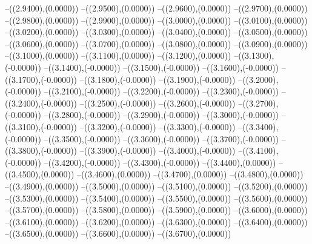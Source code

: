 {	--({\sx*(2.9400)},{\sy*(0.0000)})
	--({\sx*(2.9500)},{\sy*(0.0000)})
	--({\sx*(2.9600)},{\sy*(0.0000)})
	--({\sx*(2.9700)},{\sy*(0.0000)})
	--({\sx*(2.9800)},{\sy*(0.0000)})
	--({\sx*(2.9900)},{\sy*(0.0000)})
	--({\sx*(3.0000)},{\sy*(0.0000)})
	--({\sx*(3.0100)},{\sy*(0.0000)})
	--({\sx*(3.0200)},{\sy*(0.0000)})
	--({\sx*(3.0300)},{\sy*(0.0000)})
	--({\sx*(3.0400)},{\sy*(0.0000)})
	--({\sx*(3.0500)},{\sy*(0.0000)})
	--({\sx*(3.0600)},{\sy*(0.0000)})
	--({\sx*(3.0700)},{\sy*(0.0000)})
	--({\sx*(3.0800)},{\sy*(0.0000)})
	--({\sx*(3.0900)},{\sy*(0.0000)})
	--({\sx*(3.1000)},{\sy*(0.0000)})
	--({\sx*(3.1100)},{\sy*(0.0000)})
	--({\sx*(3.1200)},{\sy*(0.0000)})
	--({\sx*(3.1300)},{\sy*(-0.0000)})
	--({\sx*(3.1400)},{\sy*(-0.0000)})
	--({\sx*(3.1500)},{\sy*(-0.0000)})
	--({\sx*(3.1600)},{\sy*(-0.0000)})
	--({\sx*(3.1700)},{\sy*(-0.0000)})
	--({\sx*(3.1800)},{\sy*(-0.0000)})
	--({\sx*(3.1900)},{\sy*(-0.0000)})
	--({\sx*(3.2000)},{\sy*(-0.0000)})
	--({\sx*(3.2100)},{\sy*(-0.0000)})
	--({\sx*(3.2200)},{\sy*(-0.0000)})
	--({\sx*(3.2300)},{\sy*(-0.0000)})
	--({\sx*(3.2400)},{\sy*(-0.0000)})
	--({\sx*(3.2500)},{\sy*(-0.0000)})
	--({\sx*(3.2600)},{\sy*(-0.0000)})
	--({\sx*(3.2700)},{\sy*(-0.0000)})
	--({\sx*(3.2800)},{\sy*(-0.0000)})
	--({\sx*(3.2900)},{\sy*(-0.0000)})
	--({\sx*(3.3000)},{\sy*(-0.0000)})
	--({\sx*(3.3100)},{\sy*(-0.0000)})
	--({\sx*(3.3200)},{\sy*(-0.0000)})
	--({\sx*(3.3300)},{\sy*(-0.0000)})
	--({\sx*(3.3400)},{\sy*(-0.0000)})
	--({\sx*(3.3500)},{\sy*(-0.0000)})
	--({\sx*(3.3600)},{\sy*(-0.0000)})
	--({\sx*(3.3700)},{\sy*(-0.0000)})
	--({\sx*(3.3800)},{\sy*(-0.0000)})
	--({\sx*(3.3900)},{\sy*(-0.0000)})
	--({\sx*(3.4000)},{\sy*(-0.0000)})
	--({\sx*(3.4100)},{\sy*(-0.0000)})
	--({\sx*(3.4200)},{\sy*(-0.0000)})
	--({\sx*(3.4300)},{\sy*(-0.0000)})
	--({\sx*(3.4400)},{\sy*(0.0000)})
	--({\sx*(3.4500)},{\sy*(0.0000)})
	--({\sx*(3.4600)},{\sy*(0.0000)})
	--({\sx*(3.4700)},{\sy*(0.0000)})
	--({\sx*(3.4800)},{\sy*(0.0000)})
	--({\sx*(3.4900)},{\sy*(0.0000)})
	--({\sx*(3.5000)},{\sy*(0.0000)})
	--({\sx*(3.5100)},{\sy*(0.0000)})
	--({\sx*(3.5200)},{\sy*(0.0000)})
	--({\sx*(3.5300)},{\sy*(0.0000)})
	--({\sx*(3.5400)},{\sy*(0.0000)})
	--({\sx*(3.5500)},{\sy*(0.0000)})
	--({\sx*(3.5600)},{\sy*(0.0000)})
	--({\sx*(3.5700)},{\sy*(0.0000)})
	--({\sx*(3.5800)},{\sy*(0.0000)})
	--({\sx*(3.5900)},{\sy*(0.0000)})
	--({\sx*(3.6000)},{\sy*(0.0000)})
	--({\sx*(3.6100)},{\sy*(0.0000)})
	--({\sx*(3.6200)},{\sy*(0.0000)})
	--({\sx*(3.6300)},{\sy*(0.0000)})
	--({\sx*(3.6400)},{\sy*(0.0000)})
	--({\sx*(3.6500)},{\sy*(0.0000)})
	--({\sx*(3.6600)},{\sy*(0.0000)})
	--({\sx*(3.6700)},{\sy*(0.0000)})
}
